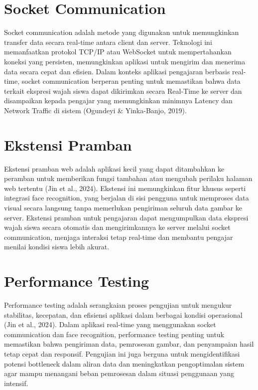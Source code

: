 \section{Socket Communication}
{Socket communication adalah metode yang digunakan untuk memungkinkan transfer data secara real-time antara client dan server. Teknologi ini memanfaatkan protokol TCP/IP atau WebSocket untuk mempertahankan koneksi yang persisten, memungkinkan aplikasi untuk mengirim dan menerima data secara cepat dan efisien. Dalam konteks aplikasi pengajaran berbasis real-time, socket communication berperan penting untuk memastikan bahwa data terkait ekspresi wajah siswa dapat dikirimkan secara Real-Time ke server dan disampaikan kepada pengajar yang memungkinkan minimnya Latency dan Network Traffic di sistem }{(Ogundeyi \& Yinka-Banjo, 2019)}{.}

\section{Ekstensi Pramban}
{Ekstensi pramban web adalah aplikasi kecil yang dapat ditambahkan ke peramban untuk memberikan fungsi tambahan atau mengubah perilaku halaman web tertentu }{(Jin et al., 2024)}{. Ekstensi ini memungkinkan fitur khusus seperti integrasi face recognition, yang berjalan di sisi pengguna untuk memproses data visual secara langsung tanpa memerlukan pengiriman seluruh data gambar ke server. Ekstensi pramban untuk pengajaran dapat mengumpulkan data ekspresi wajah siswa secara otomatis dan mengirimkannya ke server melalui socket communication, menjaga interaksi tetap real-time dan membantu pengajar menilai kondisi siswa lebih akurat.}

\section{Performance Testing}
{Performance testing adalah serangkaian proses pengujian untuk mengukur stabilitas, kecepatan, dan efisiensi aplikasi dalam berbagai kondisi operasional }{(Jin et al., 2024)}{. Dalam aplikasi real-time yang menggunakan socket communication dan face recognition, performance testing penting untuk memastikan bahwa pengiriman data, pemrosesan gambar, dan penyampaian hasil tetap cepat dan responsif. Pengujian ini juga berguna untuk mengidentifikasi potensi bottleneck dalam aliran data dan meningkatkan pengoptimalan sistem agar mampu menangani beban pemrosesan dalam situasi penggunaan yang intensif.}
